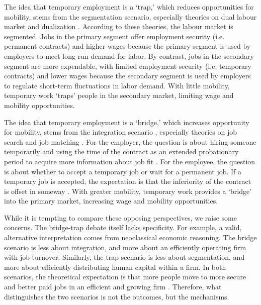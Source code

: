 \documentclass[12pt]{article}
\begin{document}
The idea that temporary employment is a `trap,' which reduces opportunities for mobility, stems from the segmentation scenario, especially theories on dual labour market \citep{doeringer_piore_1971,reich_gordon_edwards_1973} and dualization \citep{emmenegger_etal_2012,eichhorst_marx_2015}.  According to these theories, the labour market is segmented.  Jobs in the primary segment offer employment security (i.e. permanent contracts) and higher wages because the primary segment is used by employers to meet long-run demand for labor.  By contrast, jobs in the secondary segment are more expendable, with limited employment security (i.e. temporary contracts) and lower wages because the secondary segment is used by employers to regulate short-term fluctuations in labor demand.  With little mobility, temporary work `traps' people in the secondary market, limiting wage and mobility opportunities.

The idea that temporary employment is a `bridge,' which increases opportunity for mobility, stems from the integration scenario \citep{korpi_levin_2001,giesecke_gross_2003,gebel_2013}, especially theories on job search \citep{lippman_mccall_1976} and job matching  \citep{sorensen_kalleberg_1981}.  For the employer, the question is about hiring someone temporarily and using the time of the contract as an extended probationary period to acquire more information about job fit \citep{wang_weiss_1998}.  For the employee, the question is about whether to accept a temporary job or wait for a permanent job.  If a temporary job is accepted, the expectation is that the inferiority of the contract is offset in someway \citep{korpi_levin_2001}.  With greater mobility, temporary work provides a `bridge' into the primary market, increasing wage and mobility opportunities.  

While it is tempting to compare these opposing perspectives, we raise some concerns.  The bridge-trap debate itself lacks specificity.  For example, a valid, alternative interpretation comes from neoclassical economic reasoning.  The bridge scenario is less about integration, and more about an efficiently operating firm with job turnover.  Similarly, the trap scenario is less about segmentation, and more about efficiently distributing human capital within a firm.  In both scenarios, the theoretical expectation is that more people move to more secure and better paid jobs in an efficient and growing firm \citep{kalleberg_2001}.  Therefore, what distinguishes the two scenarios is not the outcomes, but the mechanisms.  
\end{document}
